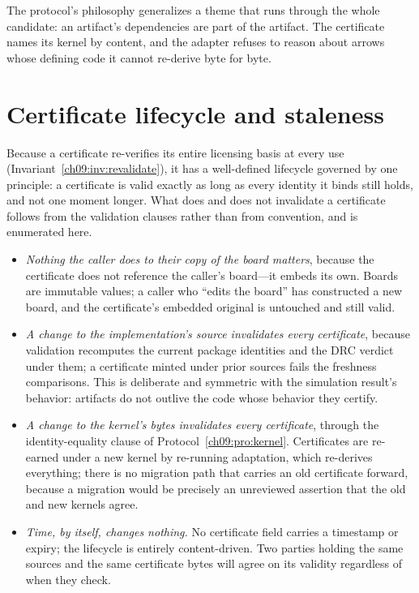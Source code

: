 The protocol's philosophy generalizes a theme that runs through the whole candidate: an artifact's dependencies are part of the artifact. The certificate names its kernel by content, and the adapter refuses to reason about arrows whose defining code it cannot re-derive byte for byte.

\section{Certificate lifecycle and staleness}\label{ch09:sec:lifecycle}

Because a certificate re-verifies its entire licensing basis at every use (Invariant~\ref{ch09:inv:revalidate}), it has a well-defined lifecycle governed by one principle: a certificate is valid exactly as long as every identity it binds still holds, and not one moment longer. What does and does not invalidate a certificate follows from the validation clauses rather than from convention, and is enumerated here.

\begin{itemize}
\item \emph{Nothing the caller does to their copy of the board matters}, because the certificate does not reference the caller's board---it embeds its own. Boards are immutable values; a caller who ``edits the board'' has constructed a new board, and the certificate's embedded original is untouched and still valid.
\item \emph{A change to the implementation's source invalidates every certificate}, because validation recomputes the current package identities and the DRC verdict under them; a certificate minted under prior sources fails the freshness comparisons. This is deliberate and symmetric with the simulation result's behavior: artifacts do not outlive the code whose behavior they certify.
\item \emph{A change to the kernel's bytes invalidates every certificate}, through the identity-equality clause of Protocol~\ref{ch09:pro:kernel}. Certificates are re-earned under a new kernel by re-running adaptation, which re-derives everything; there is no migration path that carries an old certificate forward, because a migration would be precisely an unreviewed assertion that the old and new kernels agree.
\item \emph{Time, by itself, changes nothing.} No certificate field carries a timestamp or expiry; the lifecycle is entirely content-driven. Two parties holding the same sources and the same certificate bytes will agree on its validity regardless of when they check.
\end{itemize}

